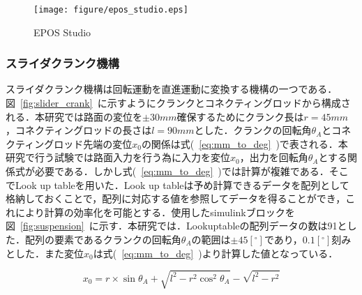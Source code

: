 \documentclass[a4paper,12pt]{article_vdlab_sotsuron}
\begin{document}
\vspace*{10mm}
\begin{figure}[htp]
  \begin{center}
    \texttt{[image: figure/epos\_studio.eps]}
    \vspace*{3mm}
    \caption{EPOS Studio}
    \label{fig:epos_studio}
  \end{center}
\end{figure}

\newpage
\subsubsection{スライダクランク機構}
スライダクランク機構は回転運動を直進運動に変換する機構の一つである．図~\ref{fig:slider_crank}~に示すようにクランクとコネクティングロッドから構成される．本研究では路面の変位を$\pm 30mm$確保するためにクランク長は$r=45mm$，コネクティングロッドの長さは$l=90mm$とした．クランクの回転角$\theta_A$とコネクティングロッド先端の変位$x_0$の関係は式(~\ref{eq:mm_to_deg}~)で表される．本研究で行う試験では路面入力を行う為に入力を変位$x_0$，出力を回転角$\theta_A$とする関係式が必要である．しかし式(~\ref{eq:mm_to_deg}~)では計算が複雑である．そこでLook up tableを用いた．Look up tableは予め計算できるデータを配列として格納しておくことで，配列に対応する値を参照してデータを得ることができ，これにより計算の効率化を可能とする．使用したsimulinkブロックを図~\ref{fig:suspension}~に示す．本研究では．Lookuptableの配列データの数は91とした．配列の要素であるクランクの回転角$\theta_A$の範囲は$\pm45[^\circ ]$であり，$0.1[^\circ ]$刻みとした．また変位$x_0$は式(~\ref{eq:mm_to_deg}~)より計算した値となっている．

\begin{equation}
 \label{eq:mm_to_deg}
x_{0} =r\times \sin \theta _{A} +\sqrt{l^{2} -r^{2}\cos^{2} \theta _{A}} -\sqrt{l^{2} -r^{2}}
\end{equation}
\end{document}
